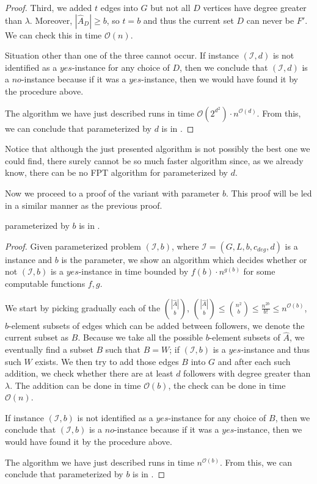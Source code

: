 \begin{proof}
    Third, we added $t$ edges into $G$ but not all $D$ vertices have degree greater than $\lambda$.
    Moreover, $|\hat{A}_D| \geq b$, so $t = b$ and thus the current set $D$ can never be $F'$.
    We can check this in time $\mathcal{O}(n)$.

    Situation other than one of the three cannot occur.
    If instance $(\mathcal{I}, d)$ is not identified as a $yes$-instance for any choice of $D$,
    then we conclude that $(\mathcal{I}, d)$ is a $no$-instance because if it was a $yes$-instance,
    then we would have found it by the procedure above.
    
    The algorithm we have just described runs in time $\mathcal{O}(2^{d^2}) \cdot n^{\mathcal{O}(d)}$.
    From this, we can conclude that \HL parameterized by $d$ is in \XP.
\end{proof}

Notice that although the just presented algorithm is not possibly the best one we could find,
there surely cannot be so much faster algorithm since, as we already know,
there can be no FPT algorithm for \HL parameterized by $d$.


Now we proceed to a proof of the variant with parameter $b$.
This proof will be led in a similar manner as the previous proof.

\begin{theorem}\label{theorem:B:XP}
    \HL parameterized by $b$ is in \XP.
\end{theorem}

\begin{proof}
    Given parameterized problem $(\mathcal{I}, b)$, where $\mathcal{I} = (G, L, b, c_{deg}, d)$ is a \HLdeg instance
    and $b$ is the parameter,
    we show an algorithm which decides whether or not $(\mathcal{I}, b)$ is a $yes$-instance in time bounded by
    $f(b) \cdot n^{g(b)}$ for some computable functions $f,g$.

    We start by picking gradually each of the $\binom{|\hat{A}|}{b}$,
    $\binom{|\hat{A}|}{b} \leq \binom{n^2}{b} \leq \frac{n^{2b}}{b!} \leq n^{\mathcal{O}(b)}$,
    $b$-element subsets of edges which can be added between followers, we denote the current subset as $B$.
    Because we take all the possible $b$-element subsets of $\hat{A}$,
    we eventually find a subset $B$ such that $B = W$;
    if $(\mathcal{I}, b)$ is a $yes$-instance and thus such $W$ exists.
    We then try to add those edges $B$ into $G$ and after each such addition,
    we check whether there are at least $d$ followers
    with degree greater than $\lambda$.
    The addition can be done in time $\mathcal{O}(b)$, the check can be done in time $\mathcal{O}(n)$.

    If instance $(\mathcal{I}, b)$ is not identified as a $yes$-instance for any choice of $B$,
    then we conclude that $(\mathcal{I}, b)$ is a $no$-instance because if it was a $yes$-instance,
    then we would have found it by the procedure above.

    The algorithm we have just described runs in time $n^{\mathcal{O}(b)}$.
    From this, we can conclude that \HL parameterized by $b$ is in \XP.
\end{proof}

